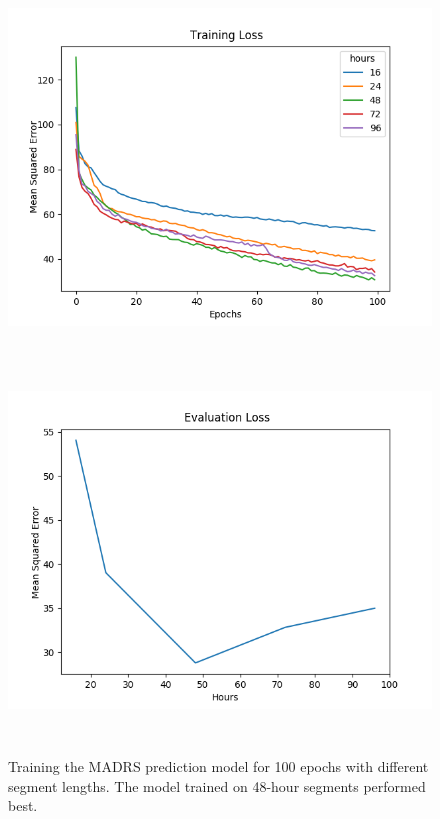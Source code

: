\begin{figure}
      \centering
      \includegraphics[height=10cm]{img/madrs_prediction/plot_loss_train.png}
      \includegraphics[height=10cm]{img/madrs_prediction/plot_loss_eval.png}

      \caption{Training the MADRS prediction model for 100 epochs with different segment lengths. The model trained on 48-hour segments performed best.}
      \label{figure:madrs_prediction_50e}
\end{figure}

